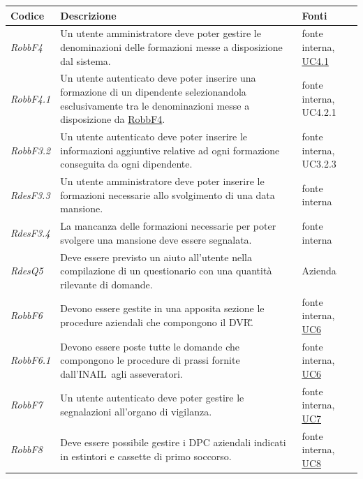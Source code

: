 \begin{flushleft}
	\begin{tabular}{|l{2cm}|l{8cm}|l{2cm}|}
		\hline
		\textbf{Codice} & \textbf{Descrizione} & \textbf{Fonti} \\
		\hline
		\label{RobbF4}
		\textit{RobbF4} & Un utente amministratore deve poter gestire le denominazioni delle formazioni messe a disposizione dal sistema. &  fonte interna, \hyperref[section:UC4_1]{UC4.1}\\
		\hline
		\label{RobbF4.1}
		\textit{RobbF4.1} & Un utente autenticato deve poter inserire una formazione di un dipendente selezionandola esclusivamente tra le denominazioni messe a disposizione da \hyperref[RobbF4]{RobbF4}. &  fonte interna, UC4.2.1 \\
		\hline
		\label{RobbF4.2}
		\textit{RobbF3.2} & Un utente autenticato deve poter inserire le informazioni aggiuntive relative ad ogni formazione conseguita da ogni dipendente. & fonte interna, UC3.2.3\\
		\hline
		\label{RdesF3.3}
		\textit{RdesF3.3} & Un utente amministratore deve poter inserire le formazioni necessarie allo svolgimento di una data mansione. & fonte interna \\
		\hline
		\label{RdesF3.4}
		\textit{RdesF3.4} & La mancanza delle formazioni necessarie per poter svolgere una mansione deve essere segnalata. & fonte interna \\
		\hline
		\label{RobbQ5}
		\textit{RdesQ5} & Deve essere previsto un aiuto all'utente nella compilazione di un  questionario con una quantità rilevante di domande. & Azienda \\
		\hline
		\label{RobbF6}
		\textit{RobbF6} & Devono essere gestite in una apposita sezione le procedure aziendali che compongono il \gls{DVR}\G. & fonte interna, \hyperref[section:UC6]{UC6}\\
		\hline
		\label{RobbF6.1}
		\textit{RobbF6.1} & Devono essere poste tutte le domande che compongono le procedure di prassi fornite dall'\gls{INAIL}\ agli asseveratori. &  fonte interna, \hyperref[section:UC6]{UC6}\\
		\hline
		\label{RdesF7}
		\textit{RobbF7} & Un utente autenticato deve poter gestire le segnalazioni all'organo di vigilanza. & fonte interna,  \hyperref[section:UC7]{UC7}\\
		\hline
		\label{RobbF8}
		\textit{RobbF8} & Deve essere possibile gestire i  \gls{DPC} aziendali indicati in estintori e cassette di primo soccorso. & fonte interna, \hyperref[section:UC8]{UC8}\\

\end{tabular}
\end{flushleft}
